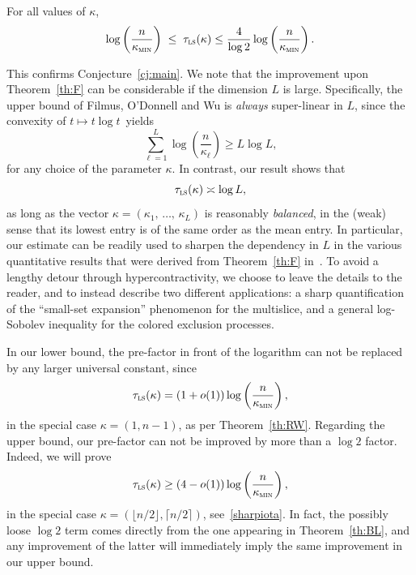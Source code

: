 \documentclass[AHL,Unicode,longabstracts,published]{cedram}
\newcommand{\tls}{\tau_{\textsc{ls}}}
\newcommand{\am}{{\kappa_{\textsc{min}}}}
\begin{document}
\begin{theo}\label{th:main}
For all values of $\kappa$,
\[
\log\left(\frac{n}{\am}\right) \; \le \; \tls(\kappa) \le \frac{4}{\log 2}\log\left(\frac{n}{\am}\right).
\]
\end{theo}

This confirms Conjecture~\ref{cj:main}. We note that the improvement upon Theorem~\ref{th:F} can be considerable if the dimension $L$ is large. Specifically, the upper bound of Filmus, {O'Donnell} and {Wu} is \emph{always} super-linear in $L$, since the convexity of $t\mapsto t\log t$~yields
\begin{equation}\label{llogl}
\sum_{\ell=1}^L \log \left(\frac{n}{\kappa_\ell}\right) \ge L\log L,
\end{equation}
for any choice of the parameter $\kappa$. In contrast, our result shows that
\[
\tls(\kappa) \asymp \log L,
\]
as long as the vector $\kappa=(\kappa_1,\,\ldots,\,\kappa_L)$ is reasonably \emph{balanced}, in the (weak) sense that its lowest entry is of the same order as the mean entry. In particular, our estimate can be readily used to sharpen the dependency in $L$ in the various quantitative results that were derived from Theorem~\ref{th:F} in~\cite{2018arXiv180903546F}. To avoid a lengthy detour through hypercontractivity, we choose to leave the details to the reader, and to instead describe two different applications: a sharp quantification of the ``small-set expansion'' phenomenon for the multislice, and a general log-Sobolev inequality for the {colored exclusion processes}.


\begin{rema}\label{rk:sharp}
In our lower bound, the pre-factor in front of the logarithm can not be replaced by any larger universal constant, since
\[
\tls(\kappa) = \left(1+o(1)\right)\log\left(\frac{n}{\am}\right),
\]
in the special case $\kappa=(1,n-1)$, as per Theorem~\ref{th:RW}. Regarding the upper bound, our pre-factor can not be improved by more than a $\log 2$ factor. Indeed, we will prove
\[
\tls(\kappa) \ge \left(4-o(1)\right)\log\left(\frac{n}{\am}\right),
\]
in the special case $\kappa=(\lfloor n/2\rfloor,\lceil n/2\rceil)$, see~\eqref{sharpiota}. In fact, the possibly loose $\log 2$ term comes directly from the one appearing in Theorem~\ref{th:BL}, and any improvement of the latter will immediately imply the same improvement in our upper bound.
\end{rema}
\end{document}
